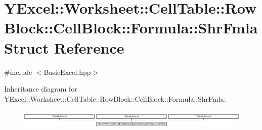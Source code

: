\hypertarget{struct_y_excel_1_1_worksheet_1_1_cell_table_1_1_row_block_1_1_cell_block_1_1_formula_1_1_shr_fmla}{}\section{Y\+Excel\+:\+:Worksheet\+:\+:Cell\+Table\+:\+:Row\+Block\+:\+:Cell\+Block\+:\+:Formula\+:\+:Shr\+Fmla Struct Reference}
\label{struct_y_excel_1_1_worksheet_1_1_cell_table_1_1_row_block_1_1_cell_block_1_1_formula_1_1_shr_fmla}


{\ttfamily \#include $<$Basic\+Excel.\+hpp$>$}

Inheritance diagram for Y\+Excel\+:\+:Worksheet\+:\+:Cell\+Table\+:\+:Row\+Block\+:\+:Cell\+Block\+:\+:Formula\+:\+:Shr\+Fmla\+:\begin{figure}[H]
\begin{center}
\leavevmode
\includegraphics[height=0.912795cm]{struct_y_excel_1_1_worksheet_1_1_cell_table_1_1_row_block_1_1_cell_block_1_1_formula_1_1_shr_fmla}
\end{center}
\end{figure}
